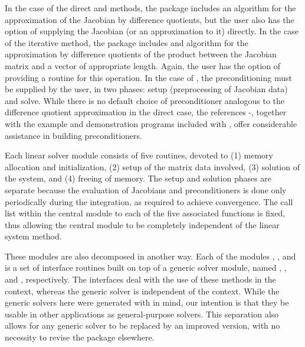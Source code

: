 In the case of the direct {\cvdense} and {\cvband} methods, the package includes
an algorithm for the approximation of the Jacobian by difference
quotients, but the user also has the option of supplying the Jacobian
(or an approximation to it) directly. In the case of the iterative
{\cvspgmr} method, the package includes and algorithm for the approximation
by difference quotients of the product between the Jacobian matrix and
a vector of appropriate length. Again, the user has the option of providing
a routine for this operation.
In  the case of {\cvspgmr}, 
the preconditioning must be supplied by the user, in two phases: 
setup (preprocessing of Jacobian data) and solve.
While there is no default
choice of preconditioner analogous to the difference quotient
approximation in the direct case, the references
\cite{BrHi:89}-\cite{Byr:92}, together with
the example and demonstration programs included with {\cvodes}, offer
considerable assistance in building preconditioners.

Each {\cvodes} linear solver module consists of five routines, devoted to (1)
memory allocation and initialization, (2) setup of the matrix data
involved, (3) solution of the system, and (4) freeing of memory.  
The setup and solution phases are separate because the evaluation of
Jacobians and preconditioners is done only periodically during the
integration, as required to achieve convergence. The call list within
the central {\cvodes} module to each of the five associated functions is
fixed, thus allowing the central module to be completely independent
of the linear system method.

These modules are also decomposed in another way.
Each of the modules {\cvdense}, {\cvband}, and {\cvspgmr} is a set of 
interface routines built on top of a generic solver module, 
named {\dense}, {\band}, and {\spgmr}, respectively.  
The interfaces deal with the use of these methods in the {\cvodes} context, 
whereas the generic solver is independent of the context.
While the generic solvers here were generated with {\sundials} in mind, our
intention is that they be usable in other applications as
general-purpose solvers.  This separation also allows for any generic
solver to be replaced by an improved version, with no necessity to
revise the {\cvodes} package elsewhere.

